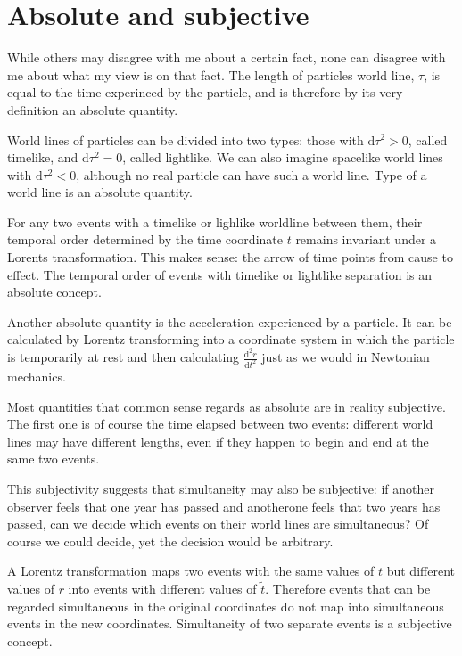 \documentclass[11pt,oneside%
]{memoir}
\newcommand{\der}[2]{\frac{\dd#1}{\dd#2}}
\newcommand{\dd}{\mathrm{d}}
\begin{document}
\section{Absolute and subjective}

While others may disagree with me about a certain fact, none can disagree with me about what my view is on that fact. The length of particles world line, \(\tau\), is equal to the time experinced by the particle, and is therefore by its very definition an absolute quantity.

World lines of particles can be divided into two types: those with \(\dd\tau^2>0\), called timelike, and \(\dd\tau^2=0\), called lightlike. We can also imagine spacelike world lines with \(\dd\tau^2<0\), although no real particle can have such a world line. Type of a world line is an absolute quantity.

For any two events with a timelike or lighlike worldline between them, their temporal order determined by the time coordinate \(t\) remains invariant under a Lorents transformation. This makes sense: the arrow of time points from cause to effect. The temporal order of events with timelike or lightlike separation is an absolute concept.

Another absolute quantity is the acceleration experienced by a particle. It can be calculated by Lorentz transforming into a coordinate system in which the particle is temporarily at rest and then calculating \(\der{^2r}{t^2}\) just as we would in Newtonian mechanics.

Most quantities that common sense regards as absolute are in reality subjective. The first one is of course the time elapsed between two events: different world lines may have different lengths, even if they happen to begin and end at the same two events.

This subjectivity suggests that simultaneity may also be subjective: if another observer feels that one year has passed and anotherone feels that two years has passed, can we decide which events on their world lines are simultaneous? Of course we could decide, yet the decision would be arbitrary.

A Lorentz transformation maps two events with the same values of \(t\) but different values of \(r\) into events with different values of \(\tilde{t}\). Therefore events that can be regarded simultaneous in the original coordinates do not map into simultaneous events in the new coordinates. Simultaneity of two separate events is a subjective concept.
\end{document}

